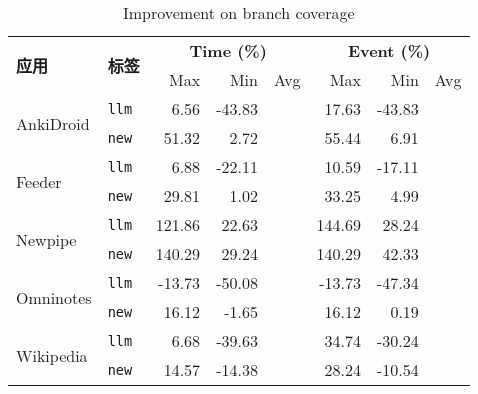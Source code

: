 \documentclass{article}
\begin{document}
\begin{table}[ht]
\centering
\small
\begin{tabular}{llrrrrrr}
\toprule
\multirow{2}{*}{\textbf{应用}} & \multirow{2}{*}{\textbf{标签}} & \multicolumn{3}{c}{\textbf{Time (\%)}} & \multicolumn{3}{c}{\textbf{Event (\%)}} \\
\cmidrule(lr){3-5} \cmidrule(lr){6-8}
& & Max & Min & Avg & Max & Min & Avg \\
\midrule

\multirow{2}{*}{AnkiDroid} 
    & \texttt{llm}  & 6.56  & {-43.83} & \cellcolor{gray!20}{-18.69} & 17.63 & {-43.83} & \cellcolor{gray!20}{-10.45} \\
    & \texttt{new}  & {51.32} & {2.72}   & \cellcolor{gray!20}{32.22}  & {55.44} & {6.91}   & \cellcolor{gray!20}{36.28}  \\
\midrule

\multirow{2}{*}{Feeder} 
    & \texttt{llm}  & 6.88  & {-22.11} & \cellcolor{gray!20}{-15.54} & 10.59 & {-17.11} & \cellcolor{gray!20}{-11.76} \\
    & \texttt{new}  & {29.81} & {1.02}   & \cellcolor{gray!20}{15.87}  & {33.25} & {4.99}   & \cellcolor{gray!20}{22.54}  \\
\midrule

\multirow{2}{*}{Newpipe} 
    & \texttt{llm}  & {121.86} & {22.63}  & \cellcolor{gray!20}{32.71}  & 144.69 & 28.24  & \cellcolor{gray!20}{41.09}  \\
    & \texttt{new}  & {140.29} & {29.24}  & \cellcolor{gray!20}{44.10}  & {140.29} & {42.33}  & \cellcolor{gray!20}{51.83}  \\
\midrule

\multirow{2}{*}{Omninotes} 
    & \texttt{llm}  & -13.73 & {-50.08} & \cellcolor{gray!20}{-39.31} & -13.73 & {-47.34} & \cellcolor{gray!20}{-35.73} \\
    & \texttt{new}  & {16.12}  & {-1.65}  & \cellcolor{gray!20}{3.55}   & {16.12}  & {0.19}   & \cellcolor{gray!20}{9.44}   \\
\midrule

\multirow{2}{*}{Wikipedia} 
    & \texttt{llm}  & 6.68   & {-39.63} & \cellcolor{gray!20}{-15.34} & {34.74}  & -30.24 & \cellcolor{gray!20}{-0.58}  \\
    & \texttt{new}  & {14.57}  & {-14.38} & \cellcolor{gray!20}{1.97}   & 28.24  & {-10.54} & \cellcolor{gray!20}{17.27}  \\
\bottomrule
\end{tabular}
\caption{Improvement on branch coverage}
\end{table}
\end{document}
